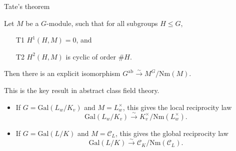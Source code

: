 \documentclass[10pt]{beamer}
\begin{document}
\begin{frame}[t]{Tate's theorem}

\begin{theorem}[Tate]
Let $ M $ be a $ G $-module, such that for all subgroups $ H \le G $,
\begin{itemize}
\item[T1] $ H^1(H, M) = 0 $, and
\item[T2] $ H^2(H, M) $ is cyclic of order $ \#H $.
\end{itemize}
Then there is an explicit isomorphism $ G^\text{ab} \xrightarrow{\sim} M^G / \mathrm{Nm}(M) $.
\end{theorem}

\pause

\vspace{0.5cm} This is the key result in abstract class field theory.

\pause

\begin{itemize}
\item If $ G = \mathrm{Gal}(L_w / K_v) $ and $ M = L_w^\times $, this gives the local reciprocity law
$$ \mathrm{Gal}(L_w / K_v) \xrightarrow{\sim} K_v^\times / \mathrm{Nm}(L_w^\times). $$

\pause

\item If $ G = \mathrm{Gal}(L / K) $ and $ M = \mathcal{C}_L $, this gives the global reciprocity law
$$ \mathrm{Gal}(L / K) \xrightarrow{\sim} \mathcal{C}_K / \mathrm{Nm}(\mathcal{C}_L). $$
\end{itemize}

\end{frame}
\end{document}
